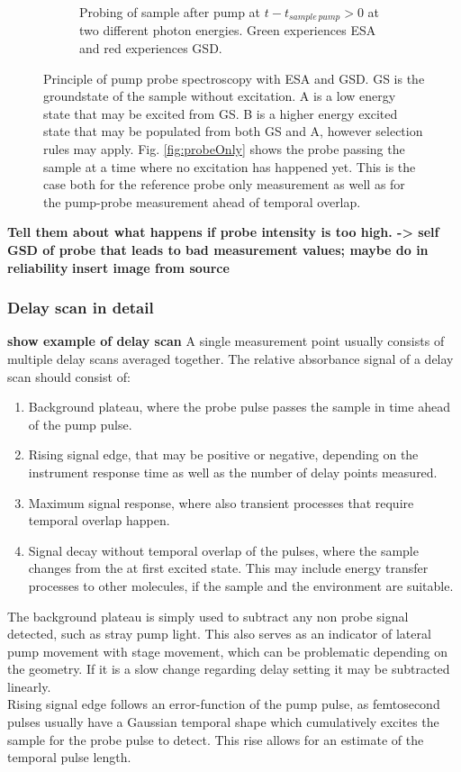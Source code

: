 \documentclass[twoside,openright]{scrreprt}
\begin{document}
\begin{figure}[hbtp]
\begin{subfigure}[t]{0.3\textwidth}
\caption{Probing of sample  after pump at $t-t_{sample\, pump} > 0$ at two different photon energies. Green experiences ESA and red experiences GSD.\label{fig:probeAfterPump}}
\end{subfigure}
\caption{Principle of pump probe spectroscopy with ESA and GSD. GS is the groundstate of the sample without excitation. A is a low energy state that may be excited from GS. B is a higher energy excited state that may be populated from both GS and A, however selection rules may apply. Fig. \ref{fig:probeOnly} shows the probe passing the sample at a time where no excitation has happened yet. This is the case both for the reference probe only measurement as well as for the pump-probe measurement ahead of temporal overlap.\label{fig:CompendiumTA}}
\end{figure}


\textbf{
Tell them about what happens if probe intensity is too high. -> self GSD of probe that leads to bad measurement values; maybe do in reliability}
\textbf{insert image from source}
\subsubsection{Delay scan in detail}
\textbf{show example of delay scan}
A single measurement point usually consists of multiple delay scans averaged together. The relative absorbance signal of a delay scan should consist of:
\begin{enumerate}
\item Background plateau, where the probe pulse passes the sample in time ahead of the pump pulse.
\item Rising signal edge, that may be positive or negative, depending on the instrument response time as well as the number of delay points measured.
\item Maximum signal response, where also transient processes that require temporal overlap happen.
\item Signal decay without temporal overlap of the pulses, where the sample changes from the at first excited state. This may include energy transfer processes to other molecules, if the sample and the environment are suitable.
\end{enumerate}
The background plateau is simply used to subtract any non probe signal detected, such as stray pump light. This also serves as an indicator of lateral pump movement with stage movement, which can be problematic depending on the geometry. If it is a slow change regarding delay setting it may be subtracted linearly.\\
Rising signal edge follows an error-function of the pump pulse, as femtosecond pulses usually have a Gaussian temporal shape which cumulatively excites the sample for the probe pulse to detect. This rise allows for an estimate of the temporal pulse length.
\end{document}
